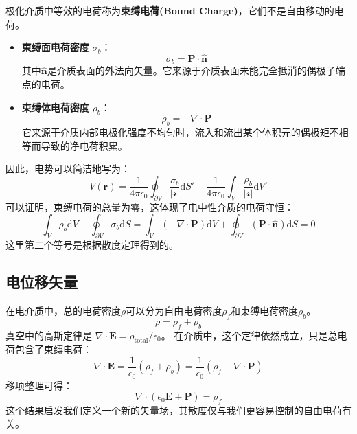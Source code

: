 \documentclass[fontset=none]{ctexart}
\begin{document}
\begin{definition}[束缚电荷]
    极化介质中等效的电荷称为\textbf{束缚电荷(Bound Charge)}，它们不是自由移动的电荷。
    \begin{itemize}
        \item \textbf{束缚面电荷密度} $\sigma_b$：
        \begin{equation}
            \sigma_b = \bm{P} \cdot \hat{\bm{n}}
        \end{equation}
        其中$\hat{\bm{n}}$是介质表面的外法向矢量。它来源于介质表面未能完全抵消的偶极子端点的电荷。
        \item \textbf{束缚体电荷密度} $\rho_b$：
        \begin{equation}
            \rho_b = -\nabla \cdot \bm{P}
        \end{equation}
        它来源于介质内部电极化强度不均匀时，流入和流出某个体积元的偶极矩不相等而导致的净电荷积累。
    \end{itemize}
\end{definition}
因此，电势可以简洁地写为：
\begin{equation}
    V(\bm{r}) = \frac{1}{4\pi\epsilon_0} \oint_{\partial V} \frac{\sigma_b}{|\bm{\mathscr{r}}|} 
    \mathrm{d}S' + \frac{1}{4\pi\epsilon_0} \int_V \frac{\rho_b}{|\bm{\mathscr{r}}|} \mathrm{d}V'
\end{equation}
可以证明，束缚电荷的总量为零，这体现了电中性介质的电荷守恒：
\begin{equation}
    \int_V \rho_b \mathrm{d}V + \oint_{\partial V} \sigma_b \mathrm{d}S 
    = \int_V (-\nabla \cdot \bm{P}) \mathrm{d}V + \oint_{\partial V} (\bm{P} \cdot \hat{\bm{n}}) 
    \mathrm{d}S = 0
\end{equation}
这里第二个等号是根据散度定理得到的。

\subsection{电位移矢量}
在电介质中，总的电荷密度$\rho$可以分为自由电荷密度$\rho_f$和束缚电荷密度$\rho_b$。
\begin{equation}
    \rho = \rho_f + \rho_b
\end{equation}
真空中的高斯定律是 $\nabla \cdot \bm{E} = \rho_{\text{total}} / \epsilon_0$。
在介质中，这个定律依然成立，只是总电荷包含了束缚电荷：
\begin{equation}
    \nabla \cdot \bm{E} = \frac{1}{\epsilon_0} (\rho_f + \rho_b) = \frac{1}{\epsilon_0} 
    (\rho_f - \nabla \cdot \bm{P})
\end{equation}
移项整理可得：
\begin{equation}
    \nabla \cdot (\epsilon_0 \bm{E} + \bm{P}) = \rho_f
\end{equation}
这个结果启发我们定义一个新的矢量场，其散度仅与我们更容易控制的自由电荷有关。
\end{document}
